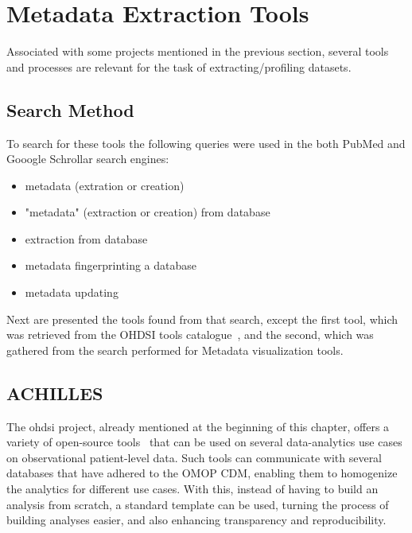 \section{Metadata Extraction Tools}

Associated with some projects mentioned in the previous section, several tools and
processes are relevant for the task of extracting/profiling datasets.

\subsection*{Search Method}

To search for these tools the following queries were used in the both PubMed and Gooogle Schrollar search engines:
\begin{itemize}
    \item metadata (extration or creation)
    \item "metadata" (extraction or creation) from database
    \item extraction from database
    \item metadata fingerprinting a database
    \item metadata updating
\end{itemize}

Next are presented the tools found from that search, except the first tool, which was retrieved from the OHDSI tools catalogue~\cite{ohdsi-tools}, and the second, which was gathered from the search performed for Metadata visualization tools.

\subsection*{ACHILLES}
The \gls{ohdsi} project, already mentioned at the beginning of this chapter, offers a variety of open-source tools~\cite{ohdsi-tools} that can be used on several data-analytics use cases on observational patient-level data.
Such tools can communicate with several databases that have adhered to the OMOP CDM, enabling them to homogenize the analytics for different use cases.
With this, instead of having to build an analysis from scratch, a standard template can be used, turning the process of building analyses easier, and also enhancing transparency and reproducibility.

